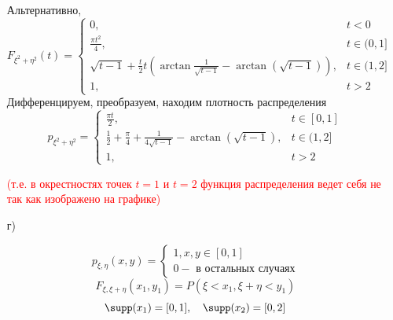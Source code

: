 \begin{enumerate}
	Альтернативно,
	\[
	F_{\xi^2 + \eta^2} (t) =
	\begin{cases}
		0, &t < 0 \\
		\frac{\pi t^2}{4}, &t \in (0, 1] \\
		\sqrt{t-1} + \frac{t}{2} t \left( \arctan \frac{1}{\sqrt{t-1}} - \arctan (\sqrt{t-1}) \right), &t \in (1, 2] \\
		1, &t > 2
	\end{cases}
	\]
	Дифференцируем, преобразуем, находим плотность распределения
	\[
	p_{\xi^2 + \eta^2} =
	\begin{cases}
		\frac{\pi t}{2}, &t \in [0,1] \\
		\frac{1}{2} + \frac{\pi}{4} + \frac{1}{4 \sqrt{t-1}} - \arctan (\sqrt{t-1}), &t \in (1,2] \\
		1, &t > 2
	\end{cases}
	\]
	
	\textcolor{red}{(т.е. в окрестностях точек $t = 1$ и $t = 2$ функция распределения ведет себя не так как изображено
	на графике)}
	
	\item[г)]
	
	\[
	p_{\xi, \eta} (x, y) =
	\begin{cases}
		1, x, y \in [0, 1] \\
		0 - \text{ в остальных случаях}
	\end{cases}
	\]
	\[
	F_{\xi, \xi + \eta} (x_1, y_1) = P(\xi < x_1, \xi + \eta < y_1)
	\]
	\[
	\supp (x_1) = [0,1], ~~~ \supp (x_2) = [0,2]
	\]
	\begin{figure}[H]
	\end{figure}
	

\end{enumerate}
